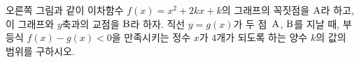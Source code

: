 \noindent\begin{minipage}[t]{0.58\linewidth}\vspace{0pt}\raggedright 오른쪽 그림과 같이 이차함수 $f(x)=x^2+2kx+k$의 그래프의 꼭짓점을 $\mathrm{A}$라 하고, 이 그래프와 $y$축과의 교점을 $\mathrm{B}$라 하자. 직선 $y=g(x)$가 두 점~$\mathrm{A}$, $\mathrm{B}$를 지날 때, 부등식 $f(x)-g(x)<0$을 만족시키는 정수 $x$가 $4$개가 되도록 하는 양수 $k$의 값의 범위를 구하시오.\end{minipage}\hfill\begin{minipage}[t]{0.4\linewidth}\vspace{0pt}\centering \resizebox{\ifdim\width>\linewidth\linewidth\else\width\fi}{!}{}\end{minipage}\par
